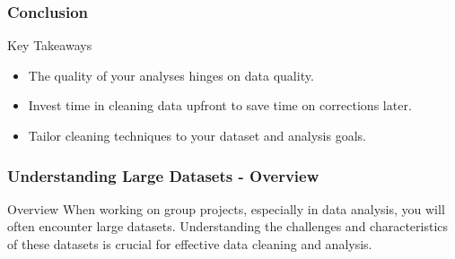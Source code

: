 \documentclass[aspectratio=169]{beamer}
\begin{document}
\begin{frame}[fragile]
    \frametitle{Conclusion}
    \begin{block}{Key Takeaways}
        \begin{itemize}
            \item The quality of your analyses hinges on data quality.
            \item Invest time in cleaning data upfront to save time on corrections later.
            \item Tailor cleaning techniques to your dataset and analysis goals.
        \end{itemize}
    \end{block}
\end{frame}

\begin{frame}[fragile]
    \frametitle{Understanding Large Datasets - Overview}
    \begin{block}{Overview}
        When working on group projects, especially in data analysis, you will often encounter large datasets. Understanding the challenges and characteristics of these datasets is crucial for effective data cleaning and analysis.
    \end{block}
\end{frame}
\end{document}

